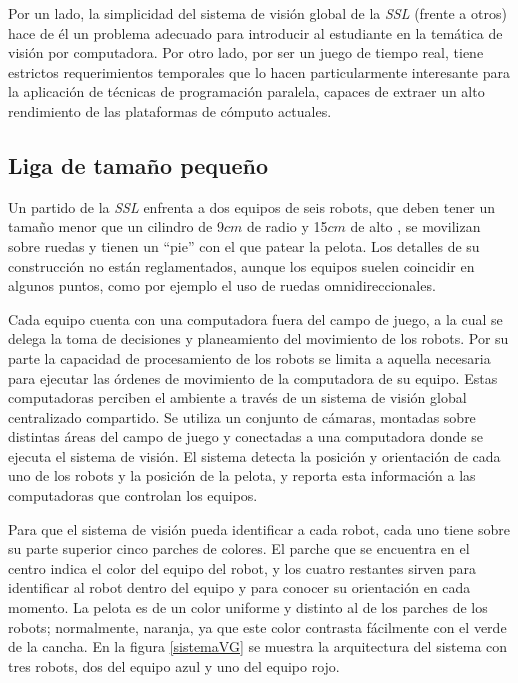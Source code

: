 Por un lado, la simplicidad del sistema de visión global de la \emph{SSL}
(frente a otros) hace de él un problema adecuado para introducir al estudiante
en la temática de visión por computadora. Por otro lado, por ser un juego de
tiempo real, tiene estrictos requerimientos temporales que lo hacen
particularmente interesante para la aplicación de técnicas de programación
paralela, capaces de extraer un alto rendimiento de las plataformas de cómputo
actuales.

\subsection{Liga de tamaño pequeño}

Un partido de la \emph{SSL} enfrenta a dos equipos de seis robots, que deben
tener un tamaño menor que un cilindro de 9$cm$ de radio y 15$cm$ de alto
\cite{sslrules2015}, se movilizan sobre ruedas y tienen un ``pie'' con el que
patear la pelota. Los detalles de su construcción no están reglamentados,
aunque los equipos suelen coincidir en algunos puntos, como por ejemplo el uso
de ruedas omnidireccionales.

Cada equipo cuenta con una computadora fuera del campo de juego, a la cual se
delega la toma de decisiones y planeamiento del movimiento de los robots. Por
su parte la capacidad de procesamiento de los robots se limita a aquella
necesaria para ejecutar las órdenes de movimiento de la computadora de su
equipo. Estas computadoras perciben el ambiente a través de un sistema de
visión global centralizado compartido. Se utiliza un conjunto de cámaras,
montadas sobre distintas áreas del campo de juego y conectadas a una
computadora donde se ejecuta el sistema de visión. El sistema detecta la
posición y orientación de cada uno de los robots y la posición de la pelota, y
reporta esta información a las computadoras que controlan los equipos.

Para que el sistema de visión pueda identificar a cada robot, cada uno tiene
sobre su parte superior cinco parches de colores. El parche que se encuentra en
el centro indica el color del equipo del robot, y los cuatro restantes sirven
para identificar al robot dentro del equipo y para conocer su orientación en
cada momento. La pelota es de un color uniforme y distinto al de los parches de
los robots; normalmente, naranja, ya que este color contrasta fácilmente con el
verde de la cancha. En la figura \ref{sistemaVG} se muestra la arquitectura del
sistema con tres robots, dos del equipo azul y uno del equipo rojo.


